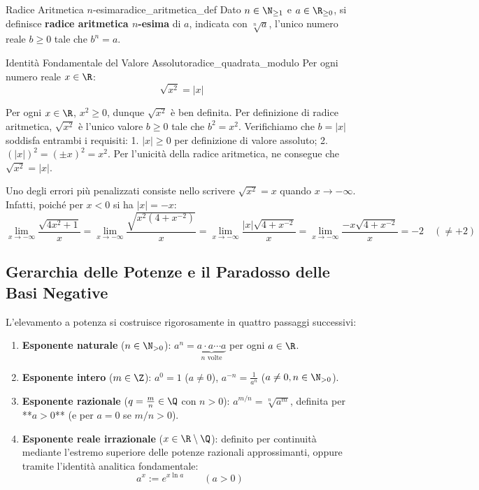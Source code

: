 \begin{definizione}{Radice Aritmetica $n$-esima}{radice_aritmetica_def}
Dato $n \in \N_{\ge 1}$ e $a \in \R_{\ge 0}$, si definisce \textbf{radice aritmetica $n$-esima} di $a$, indicata con $\sqrt[n]{a}$, l'unico numero reale $b \ge 0$ tale che $b^n = a$.
\end{definizione}

\begin{teorema}{Identità Fondamentale del Valore Assoluto}{radice_quadrata_modulo}
Per ogni numero reale $x \in \R$:
\[
    \sqrt{x^2} = |x|
\]
\end{teorema}

\begin{dimostrazione}
Per ogni $x \in \R$, $x^2 \ge 0$, dunque $\sqrt{x^2}$ è ben definita. Per definizione di radice aritmetica, $\sqrt{x^2}$ è l'unico valore $b \ge 0$ tale che $b^2 = x^2$.
Verifichiamo che $b = |x|$ soddisfa entrambi i requisiti:
1. $|x| \ge 0$ per definizione di valore assoluto;
2. $(|x|)^2 = (\pm x)^2 = x^2$.
Per l'unicità della radice aritmetica, ne consegue che $\sqrt{x^2} = |x|$.
\end{dimostrazione}

\begin{esame}
Uno degli errori più penalizzati consiste nello scrivere $\sqrt{x^2} = x$ quando $x \to -\infty$.
Infatti, poiché per $x < 0$ si ha $|x| = -x$:
\[
    \lim_{x \to -\infty} \frac{\sqrt{4x^2 + 1}}{x} = \lim_{x \to -\infty} \frac{\sqrt{x^2(4 + x^{-2})}}{x} = \lim_{x \to -\infty} \frac{|x|\sqrt{4 + x^{-2}}}{x} = \lim_{x \to -\infty} \frac{-x\sqrt{4 + x^{-2}}}{x} = -2 \quad (\neq +2)
\]
\end{esame}

\subsection{Gerarchia delle Potenze e il Paradosso delle Basi Negative}
L'elevamento a potenza si costruisce rigorosamente in quattro passaggi successivi:
\begin{enumerate}
    \item \textbf{Esponente naturale} ($n \in \N_{>0}$): $a^n = \underbrace{a \cdot a \cdots a}_{n \text{ volte}}$ per ogni $a \in \R$.
    \item \textbf{Esponente intero} ($m \in \Z$): $a^0 = 1$ ($a \neq 0$), $a^{-n} = \frac{1}{a^n}$ ($a \neq 0, n \in \N_{>0}$).
    \item \textbf{Esponente razionale} ($q = \frac{m}{n} \in \Q$ con $n > 0$): $a^{m/n} = \sqrt[n]{a^m}$, definita per **$a > 0$** (e per $a = 0$ se $m/n > 0$).
    \item \textbf{Esponente reale irrazionale} ($x \in \R \setminus \Q$): definito per continuità mediante l'estremo superiore delle potenze razionali approssimanti, oppure tramite l'identità analitica fondamentale:
    \[
        a^x := e^{x \ln a} \qquad (a > 0)
    \]
\end{enumerate}

